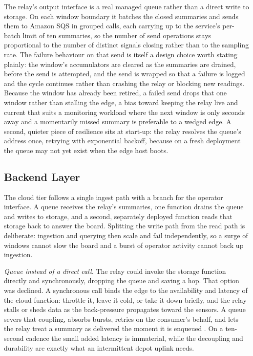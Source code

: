 \documentclass[conference]{IEEEtran}
\begin{document}
The relay's output interface is a real managed queue rather than a direct write to storage. On each window boundary it batches the closed summaries and sends them to Amazon SQS in grouped calls, each carrying up to the service's per-batch limit of ten summaries, so the number of send operations stays proportional to the number of distinct signals closing rather than to the sampling rate. The failure behaviour on that send is itself a design choice worth stating plainly: the window's accumulators are cleared as the summaries are drained, before the send is attempted, and the send is wrapped so that a failure is logged and the cycle continues rather than crashing the relay or blocking new readings. Because the window has already been retired, a failed send drops that one window rather than stalling the edge, a bias toward keeping the relay live and current that suits a monitoring workload where the next window is only seconds away and a momentarily missed summary is preferable to a wedged edge. A second, quieter piece of resilience sits at start-up: the relay resolves the queue's address once, retrying with exponential backoff, because on a fresh deployment the queue may not yet exist when the edge host boots.

\subsection{Backend Layer}

The cloud tier follows a single ingest path with a branch for the operator interface. A queue receives the relay's summaries, one function drains the queue and writes to storage, and a second, separately deployed function reads that storage back to answer the board. Splitting the write path from the read path is deliberate: ingestion and querying then scale and fail independently, so a surge of windows cannot slow the board and a burst of operator activity cannot back up ingestion.

\textit{Queue instead of a direct call.} The relay could invoke the storage function directly and synchronously, dropping the queue and saving a hop. That option was declined. A synchronous call binds the edge to the availability and latency of the cloud function: throttle it, leave it cold, or take it down briefly, and the relay stalls or sheds data as the back-pressure propagates toward the sensors. A queue severs that coupling, absorbs bursts, retries on the consumer's behalf, and lets the relay treat a summary as delivered the moment it is enqueued \cite{hohpe2003}. On a ten-second cadence the small added latency is immaterial, while the decoupling and durability are exactly what an intermittent depot uplink needs.
\end{document}
